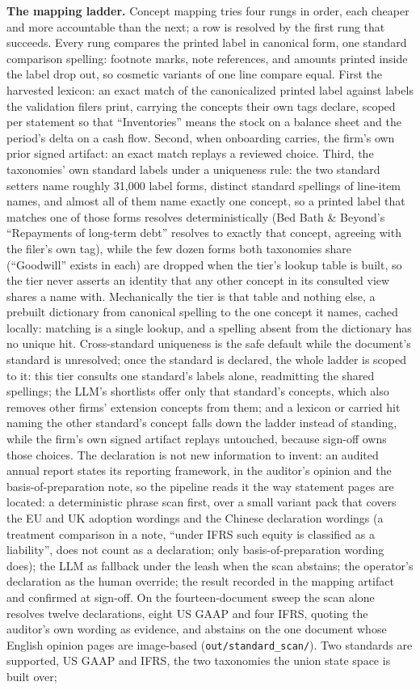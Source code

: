 \documentclass[11pt]{article}
\newcommand{\lead}[2]{\par\addvspace{5pt}\textbf{\textcolor{#1}{#2}}}
\begin{document}
\lead{navytwo}{The mapping ladder.} Concept mapping tries four rungs in order, each cheaper and more accountable than the next; a row is resolved by the first rung that succeeds. Every rung compares the printed label in canonical form, one standard comparison spelling: footnote marks, note references, and amounts printed inside the label drop out, so cosmetic variants of one line compare equal. First the harvested lexicon: an exact match of the canonicalized printed label against labels the validation filers print, carrying the concepts their own tags declare, scoped per statement so that ``Inventories'' means the stock on a balance sheet and the period's delta on a cash flow. Second, when onboarding carries, the firm's own prior signed artifact: an exact match replays a reviewed choice. Third, the taxonomies' own standard labels under a uniqueness rule: the two standard setters name roughly 31{,}000 label forms, distinct standard spellings of line-item names, and almost all of them name exactly one concept, so a printed label that matches one of those forms resolves deterministically (Bed Bath \& Beyond's ``Repayments of long-term debt'' resolves to exactly that concept, agreeing with the filer's own tag), while the few dozen forms both taxonomies share (``Goodwill'' exists in each) are dropped when the tier's lookup table is built, so the tier never asserts an identity that any other concept in its consulted view shares a name with. Mechanically the tier is that table and nothing else, a prebuilt dictionary from canonical spelling to the one concept it names, cached locally: matching is a single lookup, and a spelling absent from the dictionary has no unique hit. Cross-standard uniqueness is the safe default while the document's standard is unresolved; once the standard is declared, the whole ladder is scoped to it: this tier consults one standard's labels alone, readmitting the shared spellings; the LLM's shortlists offer only that standard's concepts, which also removes other firms' extension concepts from them; and a lexicon or carried hit naming the other standard's concept falls down the ladder instead of standing, while the firm's own signed artifact replays untouched, because sign-off owns those choices. The declaration is not new information to invent: an audited annual report states its reporting framework, in the auditor's opinion and the basis-of-preparation note, so the pipeline reads it the way statement pages are located: a deterministic phrase scan first, over a small variant pack that covers the EU and UK adoption wordings and the Chinese declaration wordings (a treatment comparison in a note, ``under IFRS such equity is classified as a liability'', does not count as a declaration; only basis-of-preparation wording does); the LLM as fallback under the leash when the scan abstains; the operator's declaration as the human override; the result recorded in the mapping artifact and confirmed at sign-off. On the fourteen-document sweep the scan alone resolves twelve declarations, eight US GAAP and four IFRS, quoting the auditor's own wording as evidence, and abstains on the one document whose English opinion pages are image-based (\texttt{out/standard\_scan/}). Two standards are supported, US GAAP and IFRS, the two taxonomies the union state space is built over; 
\end{document}
